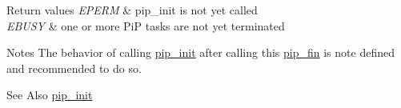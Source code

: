\begin{DoxyRetVals}{Return values}
{\em E\-P\-E\-R\-M} & {\ttfamily pip\-\_\-init} is not yet called \\
\hline
{\em E\-B\-U\-S\-Y} & {\ttfamily one} or more Pi\-P tasks are not yet terminated\\
\hline
\end{DoxyRetVals}
\begin{DoxyParagraph}{Notes}
The behavior of calling \hyperlink{group__PiP-0-init-fin_gad4e0db6c69792b3fa014e3310892a0eb}{pip\-\_\-init} after calling this \hyperlink{group__PiP-0-init-fin_gac4654282785abb9434ce81573fdf16ed}{pip\-\_\-fin} is note defined and recommended to do so.
\end{DoxyParagraph}
\begin{DoxySeeAlso}{See Also}
\hyperlink{group__PiP-0-init-fin_gad4e0db6c69792b3fa014e3310892a0eb}{pip\-\_\-init} 
\end{DoxySeeAlso}
